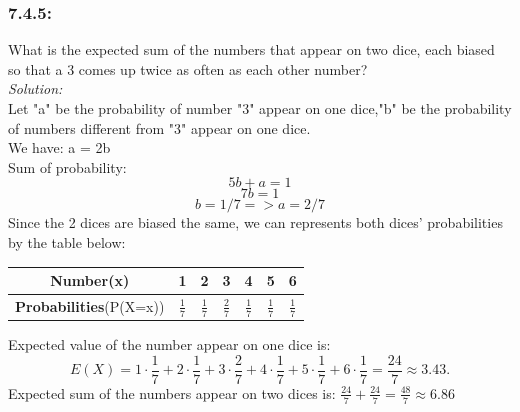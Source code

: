 \documentclass[a4paper]{article}
\begin{document}
	\subsubsection*{7.4.5:}
	What is the expected sum of the numbers that appear on
	two dice, each biased so that a 3 comes up twice as often as each other number?\\
	\textit{Solution:}\\
	Let "a" be the probability of number "3" appear on one dice,"b" be the probability of numbers different from "3" appear on one dice.\\
	We have: a = 2b\\
	Sum of probability:
	\begin{equation*}
	    5b+a=1
	\end{equation*}
	\begin{equation*}
	    7b=1
	\end{equation*}
	\begin{equation*}
	    b=1/7 => a=2/7
	\end{equation*}
	Since the 2 dices are biased the same, we can represents both dices' probabilities by the table below:
	\begin{center}
	\begin{tabular}{ |c|c|c|c|c|c|c| } 
 \hline
 \textbf{Number}(x) & 1 & 2 & 3 & 4 & 5 & 6\\ 
 \hline 
 \textbf{Probabilities}(P(X=x)) & $\frac{1}{7}$ & $\frac{1}{7}$ & $\frac{2}{7}$ & $\frac{1}{7}$ & $\frac{1}{7}$ & $\frac{1}{7}$\\ 
 \hline
\end{tabular}
\end{center}
Expected value of the number appear on one dice is:
\begin{equation*}
    E(X)=1\cdot\frac{1}{7}+2\cdot\frac{1}{7}+3\cdot\frac{2}{7}+4\cdot\frac{1}{7}+5\cdot\frac{1}{7}+6\cdot\frac{1}{7}=\frac{24}{7}\approx3.43. 
\end{equation*}
Expected sum of the numbers appear on two dices is:
$\frac{24}{7}+\frac{24}{7}=\frac{48}{7}\approx 6.86$
\end{document}
